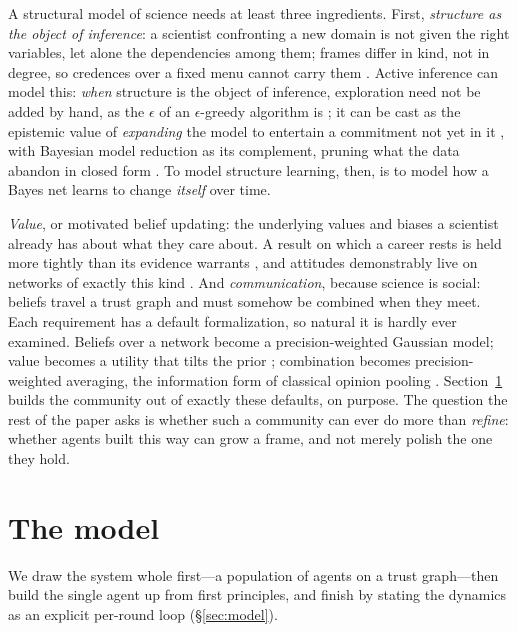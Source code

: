 \documentclass[runningheads]{llncs}
\begin{document}
A structural model of science needs at least three ingredients. First, \emph{structure as the
object of inference}: a scientist confronting a
new domain is not given the right variables, let alone the dependencies among them; frames
differ in kind, not in degree, so credences over a fixed menu cannot carry them
\citep{ullman2020,kemp2008form,ullman2012}. Active inference can model this: \emph{when}
structure is the object of inference, exploration need not be added by hand, as the
$\epsilon$ of an $\epsilon$-greedy algorithm is
\citep{zollman2010,oconnor2019}; it can be cast as the epistemic value of \emph{expanding} the
model to entertain a commitment not yet in it \citep{friston2015,friston2017curiosity}, with
Bayesian model reduction as its complement, pruning what the data abandon in closed form
\citep{friston2018bmr,neacsu2022}. To model structure learning, then, is to model how a Bayes
net learns to change \emph{itself} over time.

\emph{Value}, or motivated belief updating: the underlying values and biases a scientist
already has about what they care about. A result on which a career rests
is held more tightly than its evidence warrants \citep{kitcher1990,strevens2003}, and attitudes
demonstrably live on networks of exactly this kind \citep{dalege2016}. And \emph{communication},
because science is social: beliefs travel a trust graph and must somehow be combined when they
meet. Each requirement has a default formalization, so natural it is hardly ever examined.
Beliefs over a network become a precision-weighted Gaussian model; value becomes a utility that
tilts the prior \citep{hyland2025}; combination becomes precision-weighted averaging, the
information form of classical opinion pooling \citep{degroot1974,genest1986}.
Section~\ref{sec:bmebmr} builds the community out of exactly these defaults, on purpose. The
question the rest of the paper asks is whether such a community can ever do more than
\emph{refine}: whether agents built this way can grow a frame, and not merely polish the one
they hold.

\section{The model}
\label{sec:bmebmr}

We draw the system whole first---a population of agents on a trust graph---then build the single
agent up from first principles, and finish by stating the dynamics as an explicit per-round loop
(\S\ref{sec:model}).
\end{document}
